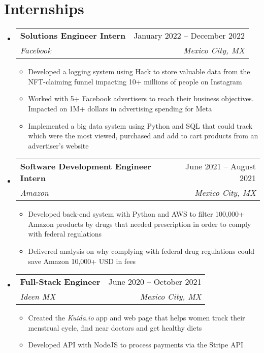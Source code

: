 \documentclass[letterpaper,11pt]{article}
\makeatletter
\newcommand{\resumeItem}[1]{
  \item\small{
    {#1 \vspace{-2pt}}
  }
}
\newcommand{\resumeSubheading}[4]{
  \vspace{-2pt}\item
    \begin{tabular*}{0.97\textwidth}[t]{l@{\extracolsep{\fill}}r}
      \textbf{#1} & #2 \\
      \textit{\small#3} & \textit{\small #4} \\
    \end{tabular*}\vspace{-7pt}
}
\newcommand{\resumeSubHeadingListStart}{\begin{itemize}[leftmargin=0.15in, label={}]}
\newcommand{\resumeSubHeadingListEnd}{\end{itemize}}
\newcommand{\resumeItemListStart}{\begin{itemize}}
\newcommand{\resumeItemListEnd}{\end{itemize}\vspace{-5pt}}
\makeatother
\begin{document}
\section{Internships}
    \resumeSubHeadingListStart
        \resumeSubheading
          {Solutions Engineer Intern}{January 2022 -- December 2022}
          {Facebook}{Mexico City, MX}
          \resumeItemListStart
            \resumeItem{Developed a logging system using Hack to store valuable data from the NFT-claiming funnel impacting 10+ millions of people on Instagram}
            \resumeItem{Worked with 5+ Facebook advertisers to reach their business objectives. Impacted on 1M+ dollars in advertising spending for Meta}
            \resumeItem{Implemented a big data system using Python and SQL that could track which were the most viewed, purchased and add to cart products from an advertiser's website}
          \resumeItemListEnd
    
        \resumeSubheading
          {Software Development Engineer Intern}{June 2021 -- August 2021}
          {Amazon}{Mexico City, MX}
          \resumeItemListStart
            \resumeItem{Developed back-end system with Python and AWS to filter 100,000+ Amazon products by drugs that needed prescription in order to comply with federal regulations}
            \resumeItem{Delivered analysis on why complying with federal drug regulations could save Amazon 10,000+ USD in fees}
        \resumeItemListEnd
    
        \resumeSubheading
          {Full-Stack Engineer}{June 2020 -- October 2021}
          {Ideen MX}{Mexico City, MX}
          \resumeItemListStart
            \resumeItem{Created the \emph{Kuida.io} app and web page that helps women track their menstrual cycle, find near doctors and get healthy diets}
            \resumeItem{Developed API with NodeJS to process payments via the Stripe API}
          \resumeItemListEnd
    \resumeSubHeadingListEnd

\end{document}
